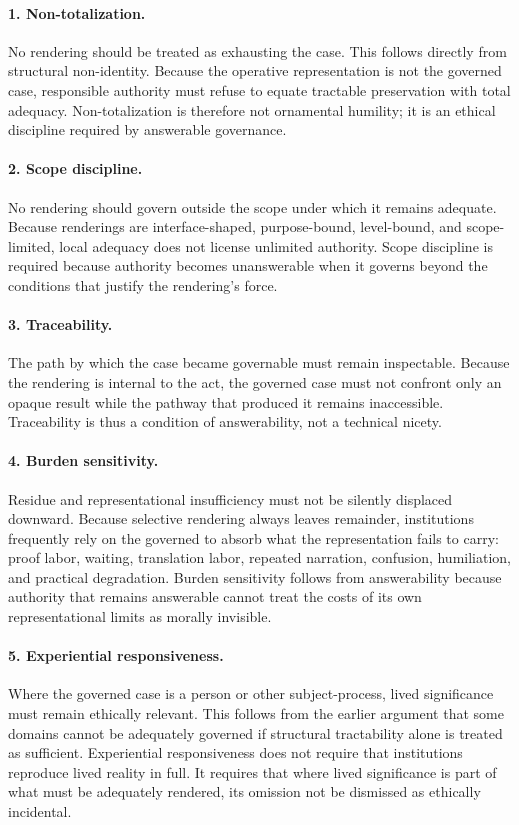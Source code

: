 \documentclass[11pt]{article}
\begin{document}
\paragraph{1. Non-totalization.}
No rendering should be treated as exhausting the case. This follows directly from structural non-identity. Because the operative representation is not the governed case, responsible authority must refuse to equate tractable preservation with total adequacy. Non-totalization is therefore not ornamental humility; it is an ethical discipline required by answerable governance.

\paragraph{2. Scope discipline.}
No rendering should govern outside the scope under which it remains adequate. Because renderings are interface-shaped, purpose-bound, level-bound, and scope-limited, local adequacy does not license unlimited authority. Scope discipline is required because authority becomes unanswerable when it governs beyond the conditions that justify the rendering's force.

\paragraph{3. Traceability.}
The path by which the case became governable must remain inspectable. Because the rendering is internal to the act, the governed case must not confront only an opaque result while the pathway that produced it remains inaccessible. Traceability is thus a condition of answerability, not a technical nicety.

\paragraph{4. Burden sensitivity.}
Residue and representational insufficiency must not be silently displaced downward. Because selective rendering always leaves remainder, institutions frequently rely on the governed to absorb what the representation fails to carry: proof labor, waiting, translation labor, repeated narration, confusion, humiliation, and practical degradation. Burden sensitivity follows from answerability because authority that remains answerable cannot treat the costs of its own representational limits as morally invisible.

\paragraph{5. Experiential responsiveness.}
Where the governed case is a person or other subject-process, lived significance must remain ethically relevant. This follows from the earlier argument that some domains cannot be adequately governed if structural tractability alone is treated as sufficient. Experiential responsiveness does not require that institutions reproduce lived reality in full. It requires that where lived significance is part of what must be adequately rendered, its omission not be dismissed as ethically incidental.
\end{document}
